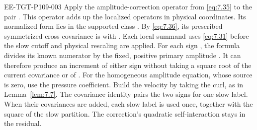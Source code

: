 \begin{EESegment}{EE-TGT-P109-003}
Apply the amplitude-correction operator 
from \eqref{eq:7.35} to the pair . This operator
adds up the localized operators in physical coordinates. Its normalized form
 lies in the supported class
. By \eqref{eq:7.36}, its prescribed symmetrized
cross covariance is  with
. Each local summand uses \eqref{eq:7.31} before the slow cutoff and
physical rescaling are applied. For each sign
, the formula divides its known numerator by the fixed,
positive primary amplitude . It can therefore produce an
increment of either sign without taking a square root of the current covariance or of
. For the homogeneous amplitude equation, whose
source is zero, use the pressure coefficient. Build the velocity by taking the curl, as in
Lemma~\ref{lem:7.7}. The covariance identity pairs the two signs for one slow label. When their
covariances are added, each slow label is used once, together with the square of the slow
partition. The correction's quadratic self-interaction stays in the residual.
\end{EESegment}


